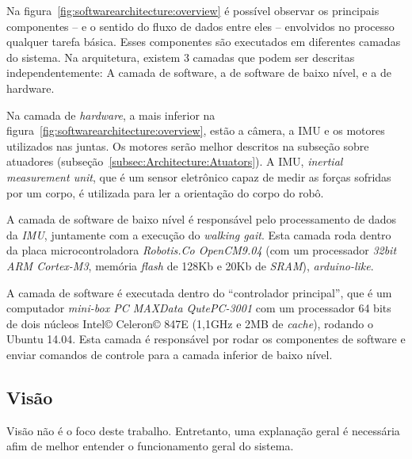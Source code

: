 Na figura~\ref{fig:softwarearchitecture:overview} é possível observar os principais componentes -- e o sentido do fluxo de dados entre eles -- envolvidos no processo qualquer tarefa básica. Esses componentes são executados em diferentes camadas do sistema. Na arquitetura, existem 3 camadas que podem ser descritas independentemente: A camada de software, a de software de baixo nível, e a de hardware.

Na camada de \textit{hardware}, a mais inferior na figura~\ref{fig:softwarearchitecture:overview}, estão a câmera, a IMU e os motores utilizados nas juntas. Os motores serão melhor descritos na subseção sobre atuadores (subseção~\ref{subsec:Architecture:Atuators}). A IMU, \textit{inertial measurement unit}, que é um sensor eletrônico capaz de medir as forças sofridas por um corpo, é utilizada para ler a orientação do corpo do robô.

A camada de software de baixo nível é responsável pelo processamento de dados da \textit{IMU}, juntamente com a execução do \textit{walking gait}. Esta camada roda dentro da placa microcontroladora \textit{Robotis.Co OpenCM9.04} (com um processador \textit{32bit ARM Cortex-M3}, memória \textit{flash} de 128Kb e 20Kb de \textit{SRAM}), \textit{arduino-like}.

A camada de software é executada dentro do ``controlador principal'', que é um computador \textit{mini-box PC MAXData QutePC-3001} com um processador 64 bits de dois núcleos Intel\copyright{} Celeron\copyright{} 847E (1,1GHz e 2MB de \textit{cache}), rodando o Ubuntu 14.04. Esta camada é responsável por rodar os componentes de software e enviar comandos de controle para a camada inferior de baixo nível.

\subsection{Visão}

Visão não é o foco deste trabalho. Entretanto, uma explanação geral é necessária afim de melhor entender o funcionamento geral do sistema.

